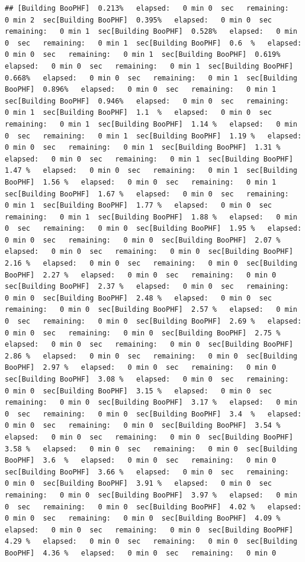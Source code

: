 \documentclass[
]{book}
\begin{document}
\begin{verbatim}
## [Building BooPHF]  0.213%   elapsed:   0 min 0  sec   remaining:   0 min 2  sec[Building BooPHF]  0.395%   elapsed:   0 min 0  sec   remaining:   0 min 1  sec[Building BooPHF]  0.528%   elapsed:   0 min 0  sec   remaining:   0 min 1  sec[Building BooPHF]  0.6  %   elapsed:   0 min 0  sec   remaining:   0 min 1  sec[Building BooPHF]  0.619%   elapsed:   0 min 0  sec   remaining:   0 min 1  sec[Building BooPHF]  0.668%   elapsed:   0 min 0  sec   remaining:   0 min 1  sec[Building BooPHF]  0.896%   elapsed:   0 min 0  sec   remaining:   0 min 1  sec[Building BooPHF]  0.946%   elapsed:   0 min 0  sec   remaining:   0 min 1  sec[Building BooPHF]  1.1  %   elapsed:   0 min 0  sec   remaining:   0 min 1  sec[Building BooPHF]  1.14 %   elapsed:   0 min 0  sec   remaining:   0 min 1  sec[Building BooPHF]  1.19 %   elapsed:   0 min 0  sec   remaining:   0 min 1  sec[Building BooPHF]  1.31 %   elapsed:   0 min 0  sec   remaining:   0 min 1  sec[Building BooPHF]  1.47 %   elapsed:   0 min 0  sec   remaining:   0 min 1  sec[Building BooPHF]  1.56 %   elapsed:   0 min 0  sec   remaining:   0 min 1  sec[Building BooPHF]  1.67 %   elapsed:   0 min 0  sec   remaining:   0 min 1  sec[Building BooPHF]  1.77 %   elapsed:   0 min 0  sec   remaining:   0 min 1  sec[Building BooPHF]  1.88 %   elapsed:   0 min 0  sec   remaining:   0 min 0  sec[Building BooPHF]  1.95 %   elapsed:   0 min 0  sec   remaining:   0 min 0  sec[Building BooPHF]  2.07 %   elapsed:   0 min 0  sec   remaining:   0 min 0  sec[Building BooPHF]  2.16 %   elapsed:   0 min 0  sec   remaining:   0 min 0  sec[Building BooPHF]  2.27 %   elapsed:   0 min 0  sec   remaining:   0 min 0  sec[Building BooPHF]  2.37 %   elapsed:   0 min 0  sec   remaining:   0 min 0  sec[Building BooPHF]  2.48 %   elapsed:   0 min 0  sec   remaining:   0 min 0  sec[Building BooPHF]  2.57 %   elapsed:   0 min 0  sec   remaining:   0 min 0  sec[Building BooPHF]  2.69 %   elapsed:   0 min 0  sec   remaining:   0 min 0  sec[Building BooPHF]  2.75 %   elapsed:   0 min 0  sec   remaining:   0 min 0  sec[Building BooPHF]  2.86 %   elapsed:   0 min 0  sec   remaining:   0 min 0  sec[Building BooPHF]  2.97 %   elapsed:   0 min 0  sec   remaining:   0 min 0  sec[Building BooPHF]  3.08 %   elapsed:   0 min 0  sec   remaining:   0 min 0  sec[Building BooPHF]  3.15 %   elapsed:   0 min 0  sec   remaining:   0 min 0  sec[Building BooPHF]  3.17 %   elapsed:   0 min 0  sec   remaining:   0 min 0  sec[Building BooPHF]  3.4  %   elapsed:   0 min 0  sec   remaining:   0 min 0  sec[Building BooPHF]  3.54 %   elapsed:   0 min 0  sec   remaining:   0 min 0  sec[Building BooPHF]  3.58 %   elapsed:   0 min 0  sec   remaining:   0 min 0  sec[Building BooPHF]  3.6  %   elapsed:   0 min 0  sec   remaining:   0 min 0  sec[Building BooPHF]  3.66 %   elapsed:   0 min 0  sec   remaining:   0 min 0  sec[Building BooPHF]  3.91 %   elapsed:   0 min 0  sec   remaining:   0 min 0  sec[Building BooPHF]  3.97 %   elapsed:   0 min 0  sec   remaining:   0 min 0  sec[Building BooPHF]  4.02 %   elapsed:   0 min 0  sec   remaining:   0 min 0  sec[Building BooPHF]  4.09 %   elapsed:   0 min 0  sec   remaining:   0 min 0  sec[Building BooPHF]  4.29 %   elapsed:   0 min 0  sec   remaining:   0 min 0  sec[Building BooPHF]  4.36 %   elapsed:   0 min 0  sec   remaining:   0 min 0  
\end{verbatim}
\end{document}
